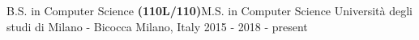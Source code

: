 

\begin{cventries}

  \cventry
    {B.S. in Computer Science \textbf{(110L/110)}\linebreak M.S. in Computer Science} %
    {Università degli studi di Milano - Bicocca} %
    {Milano, Italy} %
    {2015 - 2018  - present} %
    {
    }
\vspace{-0.7cm}
\end{cventries}

